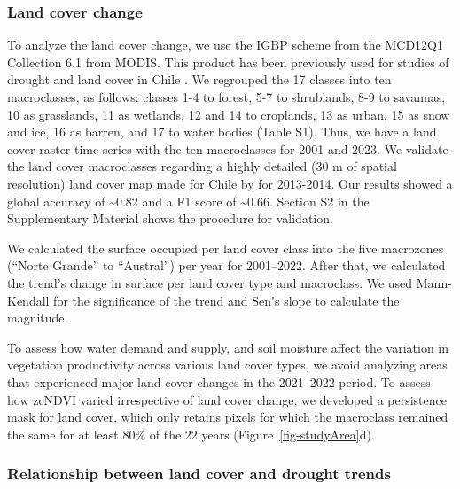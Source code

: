 \documentclass[
  authoryear,
  preprint,
  3p,
  onecolumn]{elsarticle}
\begin{document}
\hypertarget{land-cover-change}{%
\subsubsection{Land cover change}\label{land-cover-change}}

To analyze the land cover change, we use the IGBP scheme from the
MCD12Q1 Collection 6.1 from MODIS. This product has been previously used
for studies of drought and land cover in Chile
\citep{Fuentes2021, Zambrano2018}. We regrouped the 17 classes into ten
macroclasses, as follows: classes 1-4 to forest, 5-7 to shrublands, 8-9
to savannas, 10 as grasslands, 11 as wetlands, 12 and 14 to croplands,
13 as urban, 15 as snow and ice, 16 as barren, and 17 to water bodies
(Table S1). Thus, we have a land cover raster time series with the ten
macroclasses for 2001 and 2023. We validate the land cover macroclasses
regarding a highly detailed (30 m of spatial resolution) land cover map
made for Chile by \citet{Zhao2016} for 2013-2014. Our results showed a
global accuracy of \textasciitilde0.82 and a F1 score of
\textasciitilde0.66. Section S2 in the Supplementary Material shows the
procedure for validation.

We calculated the surface occupied per land cover class into the five
macrozones (``Norte Grande'' to ``Austral'') per year for 2001--2022.
After that, we calculated the trend's change in surface per land cover
type and macroclass. We used Mann-Kendall for the significance of the
trend \citep{Kendall1975} and Sen's slope to calculate the magnitude
\citep{Sen1968}.

To assess how water demand and supply, and soil moisture affect the
variation in vegetation productivity across various land cover types, we
avoid analyzing areas that experienced major land cover changes in the
2021--2022 period. To assess how zcNDVI varied irrespective of land
cover change, we developed a persistence mask for land cover, which only
retains pixels for which the macroclass remained the same for at least
80\% of the 22 years (Figure~\ref{fig-studyArea}d).

\hypertarget{relationship-between-land-cover-and-drought-trends}{%
\subsubsection{Relationship between land cover and drought
trends}\label{relationship-between-land-cover-and-drought-trends}}
\end{document}
